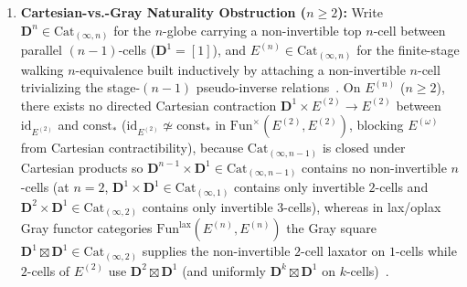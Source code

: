 \begin{proposition}
\begin{enumerate}
  \item \textbf{Cartesian-vs.-Gray Naturality Obstruction ($n \ge 2$):} Write $\mathbf{D}^n \in \mathrm{Cat}_{(\infty, n)}$ for the $n$-globe carrying a non-invertible top $n$-cell between parallel $(n-1)$-cells ($\mathbf{D}^1 = [1]$), and $E^{(n)} \in \mathrm{Cat}_{(\infty, n)}$ for the finite-stage walking $n$-equivalence built inductively by attaching a non-invertible $n$-cell trivializing the stage-$(n-1)$ pseudo-inverse relations~\cite{HenryLoubaton25,ORW26}. On $E^{(n)}$ ($n \ge 2$), there exists no directed Cartesian contraction $\mathbf{D}^1 \times E^{(2)} \to E^{(2)}$ between $\mathrm{id}_{E^{(2)}}$ and $\mathrm{const}_*$ ($\mathrm{id}_{E^{(2)}} \not\simeq \mathrm{const}_*$ in $\mathrm{Fun}^{\times}(E^{(2)}, E^{(2)})$, blocking $E^{(\omega)}$ from Cartesian contractibility), because $\mathrm{Cat}_{(\infty, n-1)}$ is closed under Cartesian products so $\mathbf{D}^{n-1} \times \mathbf{D}^1 \in \mathrm{Cat}_{(\infty, n-1)}$ contains no non-invertible $n$-cells (at $n = 2$, $\mathbf{D}^1 \times \mathbf{D}^1 \in \mathrm{Cat}_{(\infty, 1)}$ contains only invertible $2$-cells and $\mathbf{D}^2 \times \mathbf{D}^1 \in \mathrm{Cat}_{(\infty, 2)}$ contains only invertible $3$-cells), whereas in lax/oplax Gray functor categories $\mathrm{Fun}^{\mathrm{lax}}(E^{(n)}, E^{(n)})$ the Gray square $\mathbf{D}^1 \boxtimes \mathbf{D}^1 \in \mathrm{Cat}_{(\infty, 2)}$ supplies the non-invertible $2$-cell laxator on $1$-cells while $2$-cells of $E^{(2)}$ use $\mathbf{D}^2 \boxtimes \mathbf{D}^1$ (and uniformly $\mathbf{D}^k \boxtimes \mathbf{D}^1$ on $k$-cells)~\cite{GepnerHeine26,Heine26,Geiss26}.
\end{enumerate}
\end{proposition}

